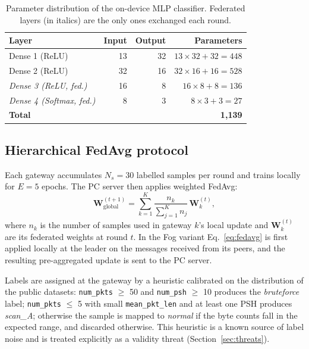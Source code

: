 \documentclass[runningheads]{llncs}
\begin{document}
\begin{table}[t]
\centering
\caption{Parameter distribution of the on-device MLP classifier. Federated
layers (in italics) are the only ones exchanged each round.}
\label{tab:mlp}
\small
\begin{tabular}{@{}lrrr@{}}
\toprule
Layer & Input & Output & Parameters \\
\midrule
Dense 1 (ReLU)              & 13 & 32 & $13 \times 32 + 32 = 448$ \\
Dense 2 (ReLU)              & 32 & 16 & $32 \times 16 + 16 = 528$ \\
\emph{Dense 3 (ReLU, fed.)} & 16 &  8 & $16 \times 8  + 8  = 136$ \\
\emph{Dense 4 (Softmax, fed.)} & 8 & 3 & $8  \times 3  + 3  = 27$  \\
\midrule
\textbf{Total} & & & \textbf{1{,}139} \\
\bottomrule
\end{tabular}
\end{table}

\subsection{Hierarchical FedAvg protocol}

Each gateway accumulates $N_s = 30$ labelled samples per round and trains
locally for $E = 5$ epochs. The PC server then applies weighted FedAvg:
\begin{equation}
\mathbf{W}_{\text{global}}^{(t+1)} =
\sum_{k=1}^{K} \frac{n_k}{\sum_{j=1}^{K} n_j}\,\mathbf{W}_k^{(t)},
\label{eq:fedavg}
\end{equation}
where $n_k$ is the number of samples used in gateway $k$'s local update
and $\mathbf{W}_k^{(t)}$ are its federated weights at round $t$. In the
Fog variant Eq.~\ref{eq:fedavg} is first applied locally at the leader on
the messages received from its peers, and the resulting pre-aggregated
update is sent to the PC server.

Labels are assigned at the gateway by a heuristic calibrated on the
distribution of the public datasets:
\texttt{num\_pkts} $\geq$ 50 and \texttt{num\_psh} $\geq$ 10 produces the
\emph{bruteforce} label; \texttt{num\_pkts} $\leq$ 5 with small
\texttt{mean\_pkt\_len} and at least one PSH produces \emph{scan\_A};
otherwise the sample is mapped to \emph{normal} if the byte counts fall in
the expected range, and discarded otherwise. This heuristic is a known
source of label noise and is treated explicitly as a validity threat
(Section~\ref{sec:threats}).
\end{document}
